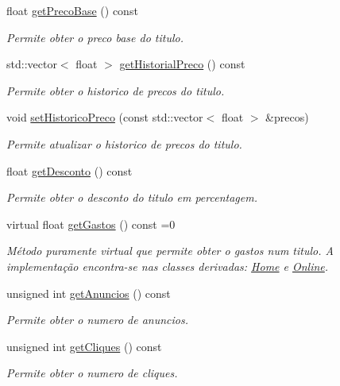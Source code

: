\begin{DoxyCompactItemize}
float \mbox{\hyperlink{class_titulo_a5257cbaf35ad018001a7e48678795305}{get\+Preco\+Base}} () const
\begin{DoxyCompactList}\small\item\em Permite obter o preco base do titulo. \end{DoxyCompactList}\item 
std\+::vector$<$ float $>$ \mbox{\hyperlink{class_titulo_ab392d79a55b0ce556e03ad5a2fecad05}{get\+Historial\+Preco}} () const
\begin{DoxyCompactList}\small\item\em Permite obter o historico de precos do titulo. \end{DoxyCompactList}\item 
void \mbox{\hyperlink{class_titulo_a8ea091928732a5ff5b974e003668a778}{set\+Historico\+Preco}} (const std\+::vector$<$ float $>$ \&precos)
\begin{DoxyCompactList}\small\item\em Permite atualizar o historico de precos do titulo. \end{DoxyCompactList}\item 
float \mbox{\hyperlink{class_titulo_ae7df7d468f8220fa32b2772df4c53081}{get\+Desconto}} () const
\begin{DoxyCompactList}\small\item\em Permite obter o desconto do titulo em percentagem. \end{DoxyCompactList}\item 
virtual float \mbox{\hyperlink{class_titulo_a9272448eec05cd9c026c54824bf2e727}{get\+Gastos}} () const =0
\begin{DoxyCompactList}\small\item\em Método puramente virtual que permite obter o gastos num titulo. A implementação encontra-\/se nas classes derivadas\+: \mbox{\hyperlink{class_home}{Home}} e \mbox{\hyperlink{class_online}{Online}}. \end{DoxyCompactList}\item 
unsigned int \mbox{\hyperlink{class_titulo_ad36afe75694812eabe74af5fe32ad95b}{get\+Anuncios}} () const
\begin{DoxyCompactList}\small\item\em Permite obter o numero de anuncios. \end{DoxyCompactList}\item 
unsigned int \mbox{\hyperlink{class_titulo_a71d5b5985170de5612ec49c5c955f120}{get\+Cliques}} () const
\begin{DoxyCompactList}\small\item\em Permite obter o numero de cliques. \end{DoxyCompactList}\item 

\end{DoxyCompactItemize}
